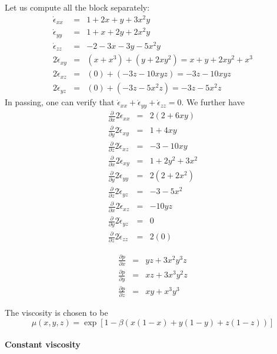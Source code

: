 Let us compute all the block separately:
\begin{eqnarray}
\dot{\epsilon}_{xx}&=& 1+2x+y+3x^2y  \nonumber\\
\dot{\epsilon}_{yy}&=& 1+x+2y+2x^2y \nonumber\\
\dot{\epsilon}_{zz}&=& -2-3x-3y-5x^2y \nonumber\\
2 \dot{\epsilon}_{xy}&=& (x+x^3)+(y+2xy^2) = x+y+2xy^2+x^3 \nonumber\\
2 \dot{\epsilon}_{xz}&=& (0)+(-3z-10xyz) = -3z -10xyz  \nonumber\\
2 \dot{\epsilon}_{yz}&=& (0) + (-3z-5x^2z) = -3z-5x^2z   \nonumber
\end{eqnarray}
In passing, one can verify that 
$
\dot{\epsilon}_{xx}
+\dot{\epsilon}_{yy}
+\dot{\epsilon}_{zz}=0
$.
We further have
\begin{eqnarray}
\frac{\partial}{\partial x} 2\dot{\epsilon}_{xx}&=& 2(2 +6xy) \nonumber\\ 
\frac{\partial}{\partial y} 2\dot{\epsilon}_{xy}&=&  1+4xy \nonumber\\
\frac{\partial}{\partial z} 2\dot{\epsilon}_{xz}&=& -3 -10xy   \nonumber\\ 
\frac{\partial}{\partial x} 2\dot{\epsilon}_{xy}&=& 1+2y^2+3x^2 \nonumber\\ 
\frac{\partial}{\partial y} 2\dot{\epsilon}_{yy}&=& 2( 2+2x^2 ) \nonumber\\ 
\frac{\partial}{\partial z} 2\dot{\epsilon}_{yz}&=& -3-5x^2   \nonumber\\
\frac{\partial}{\partial x} 2\dot{\epsilon}_{xz}&=& -10yz \nonumber\\ 
\frac{\partial}{\partial y} 2\dot{\epsilon}_{yz}&=& 0  \nonumber\\ 
\frac{\partial}{\partial z} 2\dot{\epsilon}_{zz}&=& 2( 0 ) \nonumber
\end{eqnarray}

\begin{eqnarray}
\frac{\partial p}{\partial x} &=& yz+3x^2y^3z\\
\frac{\partial p}{\partial y} &=& xz +3x^3y^2z \\
\frac{\partial p}{\partial z} &=& xy+x^3y^3
\end{eqnarray}

The viscosity is chosen to be 
\[
\mu(x,y,z) = \exp \left[ 1-\beta ( x(1-x)+y(1-y)+z(1-z) )   \right]
\]

\paragraph{Constant viscosity}

